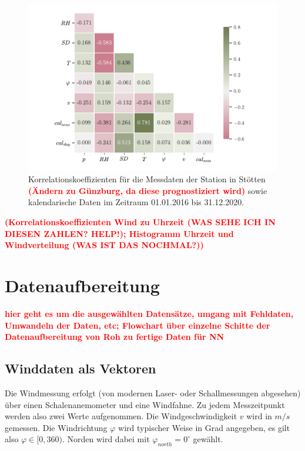 \documentclass[
12pt, %
toc=listofnumbered, %
toc=chapterentrydotfill, %
numbers=noenddot, %
captions=tableheading, %
bibliography=numbered
]{scrreprt}
\let\Oldsection\section
\renewcommand{\section}{\FloatBarrier\Oldsection}
\let\Oldsubsection\subsection
\renewcommand{\subsection}{\FloatBarrier\Oldsubsection}
\newcommand{\highlight}[1]{\textbf{\textcolor{red}{#1}}}
\begin{document}
\begin{figure}[tph]
	\begin{center}
		\includegraphics[]{./images/corr.pdf}
		\caption{Korrelationskoeffizienten für die Messdaten der Station in Stötten \highlight{(Ändern zu Günzburg, da diese prognostiziert wird)} sowie kalendarische Daten im Zeitraum 01.01.2016 bis 31.12.2020.}
		\label{fig:corr}
	\end{center}
\end{figure}

\highlight{(Korrelationskoeffizienten Wind zu Uhrzeit (WAS SEHE ICH IN DIESEN ZAHLEN? HELP!); Histogramm Uhrzeit und Windverteilung (WAS IST DAS NOCHMAL?))}

\section{Datenaufbereitung}\label{section:Datenaufbereitung}
\highlight{hier geht es um die ausgewählten Datensätze, umgang mit Fehldaten, 
Umwandeln der Daten, etc;  
Flowchart über einzelne Schitte der Datenaufbereitung von Roh zu fertige Daten für NN}

\subsection{Winddaten als Vektoren}
Die Windmessung erfolgt (von modernen Laser- oder Schallmessungen abgesehen) über einen Schalenanemometer und eine Windfahne. Zu jedem Messzeitpunkt werden also zwei Werte aufgenommen. Die Windgeschwindigkeit $v$ wird in $m/s$ gemessen. Die Windrichtung $\varphi$ wird typischer Weise in Grad angegeben, es gilt also $\varphi \in [0,360)$. Norden wird dabei mit $\varphi_{north} = 0^\circ$ gewählt.  
\end{document}
